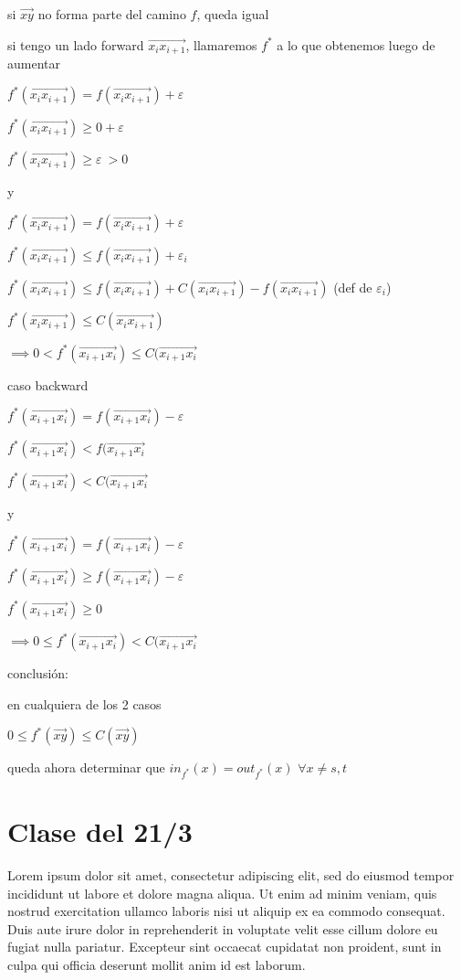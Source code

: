 \documentclass[12pt]{article}
\begin{document}
si $\overrightarrow{xy}$ no forma parte del camino $f$, queda igual

si tengo un lado forward $\overrightarrow{x_{i}x_{i+1}}$, llamaremos $f^*$ a lo que obtenemos luego de aumentar

\(f^*(\overrightarrow{x_{i}x_{i+1}}) = f(\overrightarrow{x_{i}x_{i+1}}) + \varepsilon\)

\(f^*(\overrightarrow{x_{i}x_{i+1}}) \geq 0 + \varepsilon\)

\(f^*(\overrightarrow{x_{i}x_{i+1}}) \geq  \varepsilon\ > 0\)



y

\(f^*(\overrightarrow{x_{i}x_{i+1}}) = f(\overrightarrow{x_{i}x_{i+1}}) + \varepsilon\)

\(f^*(\overrightarrow{x_{i}x_{i+1}}) \leq f(\overrightarrow{x_{i}x_{i+1}}) + \varepsilon_i \)

\(f^*(\overrightarrow{x_{i}x_{i+1}}) \leq  f(\overrightarrow{x_{i}x_{i+1}}) +  C(\overrightarrow{x_{i}x_{i+1}}) - f(\overrightarrow{x_{i}x_{i+1}})\)              (def de $\varepsilon_i$)

\(f^*(\overrightarrow{x_{i}x_{i+1}}) \leq C(\overrightarrow{x_{i}x_{i+1}}) \)

\(\implies 0 < f^*(\overrightarrow{x_{i+1}x_{i}}) \leq C(\overrightarrow{x_{i+1}x_{i}} \)

caso backward

\(f^*(\overrightarrow{x_{i+1}x_{i}}) = f(\overrightarrow{x_{i+1}x_{i}}) - \varepsilon\)

\(f^*(\overrightarrow{x_{i+1}x_{i}}) < f(\overrightarrow{x_{i+1}x_{i}}\)

\(f^*(\overrightarrow{x_{i+1}x_{i}}) < C(\overrightarrow{x_{i+1}x_{i}}\)

y 

\(f^*(\overrightarrow{x_{i+1}x_{i}}) = f(\overrightarrow{x_{i+1}x_{i}}) - \varepsilon\)

\(f^*(\overrightarrow{x_{i+1}x_{i}}) \geq f(\overrightarrow{x_{i+1}x_{i}}) - \varepsilon\)

\(f^*(\overrightarrow{x_{i+1}x_{i}}) \geq 0\)

\(\implies 0 \leq f^*(\overrightarrow{x_{i+1}x_{i}}) <C(\overrightarrow{x_{i+1}x_{i}} \)

conclusión:

en cualquiera de los 2 casos

\(0 \leq f^*(\overrightarrow{xy}) \leq C(\overrightarrow{xy}) \)

queda ahora determinar que $in_{f^*}(x) = out_{f^*}(x)$ $\forall x \ne s, t$
\newpage

\section*{Clase del 21/3}
Lorem ipsum dolor sit amet, consectetur adipiscing elit, sed do eiusmod tempor incididunt ut labore et dolore magna aliqua. Ut enim ad minim veniam, quis nostrud exercitation ullamco laboris nisi ut aliquip ex ea commodo consequat. Duis aute irure dolor in reprehenderit in voluptate velit esse cillum dolore eu fugiat nulla pariatur. Excepteur sint occaecat cupidatat non proident, sunt in culpa qui officia deserunt mollit anim id est laborum.
\end{document}
